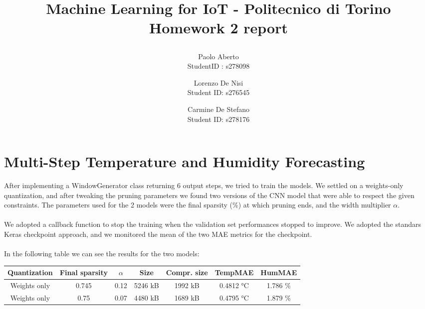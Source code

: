 \documentclass{article}
\date{}
\begin{document}
\author{Paolo Aberto\\
StudentID : s278098\\

\and
Lorenzo De Nisi\\
Student ID: s276545\\

\and
Carmine De Stefano\\
Student ID: s278176\\
}

\justifying

\title{
    \vspace{.5cm}
    
    Machine Learning for IoT - 
    Politecnico di Torino\\
    \vspace{1cm}
    \Large \textbf{Homework 2 report}
    \vspace{.5cm}
}

\maketitle
\thispagestyle{empty} 
\vspace{-0.5cm}


\section{Multi-Step Temperature and Humidity Forecasting}
After implementing a WindowGenerator class returning 6 output steps, we tried to train the models. We settled on a weights-only quantization, and after tweaking the pruning parameters we found two versions of the CNN model that were able to respect the given constraints.
The parameters used for the 2 models were the final sparsity (\%) at which pruning ends, and the width multiplier $\alpha$.
\\\\
We adopted a callback function to stop the training when the validation set performances stopped to improve. We adopted the standars Keras checkpoint approach, and we monitored the mean of the two MAE metrics for the checkpoint. 
\\\\
In the following table we can see the results for the two models:

\vspace{0.2cm}

\begin{center}
\begin{tabular}{ |c|c|c|c|c|c|c| } 
\hline
\textbf{Quantization} & \textbf{Final sparsity} & \textbf{$\alpha$} &\textbf{Size} &\textbf{Compr. size} &\textbf{TempMAE}&\textbf{HumMAE} \\
\hline
Weights only & 0.745 & 0.12 & 5246 kB & 1992 kB & 0.4812 °C & 1.786 \% \\ 
Weights only & 0.75  & 0.07 & 4480 kB & 1689 kB & 0.4795 °C & 1.879 \% \\ 
\hline

\end{tabular}

\end{center}
\end{document}
